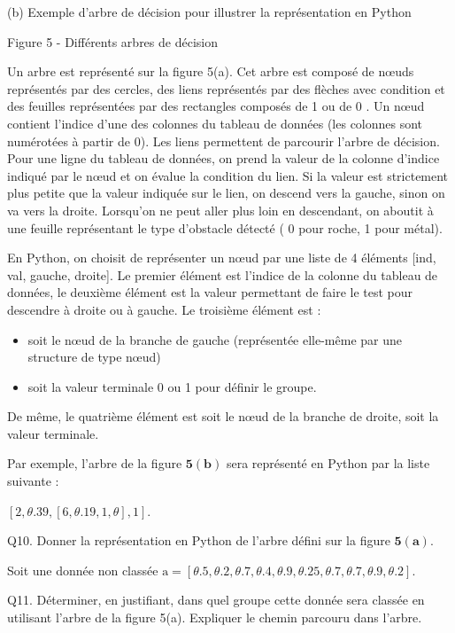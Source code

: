 \documentclass[10pt]{article}
\begin{document}
(b) Exemple d'arbre de décision pour illustrer la représentation en Python

Figure 5 - Différents arbres de décision

Un arbre est représenté sur la figure 5(a). Cet arbre est composé de nœuds représentés par des cercles, des liens représentés par des flèches avec condition et des feuilles représentées par des rectangles composés de 1 ou de 0 . Un nœud contient l'indice d'une des colonnes du tableau de données (les colonnes sont numérotées à partir de 0). Les liens permettent de parcourir l'arbre de décision. Pour une ligne du tableau de données, on prend la valeur de la colonne d'indice indiqué par le nœud et on évalue la condition du lien. Si la valeur est strictement plus petite que la valeur indiquée sur le lien, on descend vers la gauche, sinon on va vers la droite. Lorsqu'on ne peut aller plus loin en descendant, on aboutit à une feuille représentant le type d'obstacle détecté ( 0 pour roche, 1 pour métal).

En Python, on choisit de représenter un nœud par une liste de 4 éléments [ind, val, gauche, droite]. Le premier élément est l'indice de la colonne du tableau de données, le deuxième élément est la valeur permettant de faire le test pour descendre à droite ou à gauche. Le troisième élément est :

\begin{itemize}
  \item soit le nœud de la branche de gauche (représentée elle-même par une structure de type nœud)

  \item soit la valeur terminale 0 ou 1 pour définir le groupe.

\end{itemize}
De même, le quatrième élément est soit le nœud de la branche de droite, soit la valeur terminale.

Par exemple, l'arbre de la figure $\mathbf{5}(\mathbf{b})$ sera représenté en Python par la liste suivante :

$[2, \theta .39,[6, \theta .19,1, \theta], 1] .$

Q10. Donner la représentation en Python de l'arbre défini sur la figure $\mathbf{5}(\mathbf{a})$.

Soit une donnée non classée $\mathrm{a}=[\theta .5, \theta .2, \theta .7, \theta .4, \theta .9, \theta .25, \theta .7, \theta .7, \theta .9, \theta .2]$.

Q11. Déterminer, en justifiant, dans quel groupe cette donnée sera classée en utilisant l'arbre de la figure 5(a). Expliquer le chemin parcouru dans l'arbre.
\end{document}
